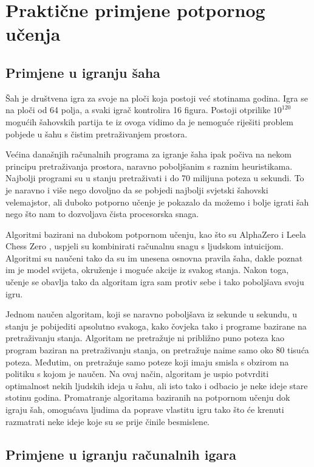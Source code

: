 \documentclass[times,utf8,diplomski]{fer}
\begin{document}
\chapter{Praktične primjene potpornog učenja}

\section{Primjene u igranju šaha}

Šah je društvena igra za svoje na ploči koja postoji već stotinama godina. Igra se na ploči od 64 polja, a svaki igrač kontrolira 16 figura. Postoji otprilike ${10^{120}}$ mogućih šahovskih partija te iz ovoga vidimo da je nemoguće riješiti problem pobjede u šahu s čistim pretraživanjem prostora.

Većina današnjih računalnih programa za igranje šaha ipak počiva na nekom principu pretraživanja prostora, naravno poboljšanim s raznim heuristikama. Najbolji programi su u stanju pretraživati i do 70 milijuna poteza u sekundi. To je naravno i više nego dovoljno da se pobjedi najbolji svjetski šahovski velemajstor, ali duboko potporno učenje je pokazalo da možemo i bolje igrati šah nego što nam to dozvoljava čista procesorska snaga.

Algoritmi bazirani na dubokom potpornom učenju, kao što su AlphaZero \citep{alphazero} i Leela Chess Zero  \citep{lc0}, uspjeli su kombinirati računalnu snagu s ljudskom intuicijom. Algoritmi su naučeni tako da su im unesena osnovna pravila šaha, dakle poznat im je model svijeta, okruženje i moguće akcije iz svakog stanja. Nakon toga, učenje se obavlja tako da algoritam igra sam protiv sebe i tako poboljšava svoju igru.

Jednom naučen algoritam, koji se naravno poboljšava iz sekunde u sekundu, u stanju je pobijediti apsolutno svakoga, kako čovjeka tako i programe bazirane na pretraživanju stanja. Algoritam ne pretražuje ni približno puno poteza kao program baziran na pretraživanju stanja, on pretražuje naime samo oko 80 tisuća poteza. Međutim, on pretražuje samo poteze koji imaju smisla s obzirom na politiku s kojom je naučen. Na ovaj način, algoritam je uspio potvrditi optimalnost nekih ljudskih ideja u šahu, ali isto tako i odbacio je neke ideje stare stotinu godina. Promatranje algoritama baziranih na potpornom učenju dok igraju šah, omogućava ljudima da poprave vlastitu igru tako što će krenuti razmatrati neke ideje koje su se prije činile besmislene.

\section{Primjene u igranju računalnih igara}
\end{document}
